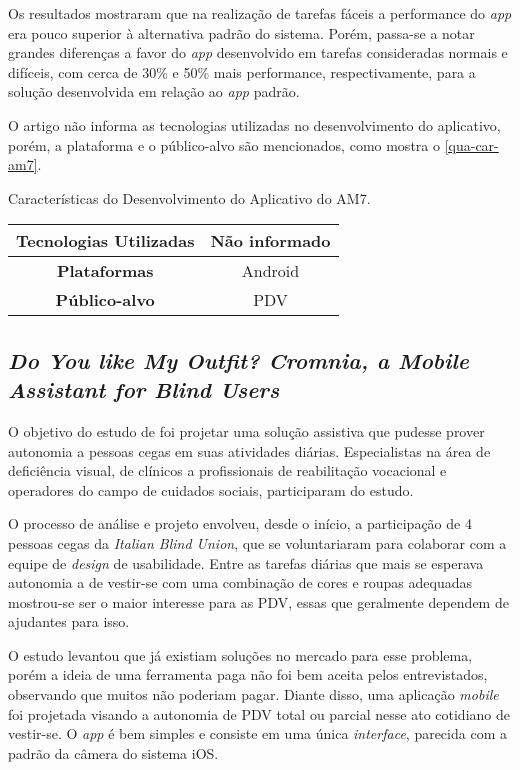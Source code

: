 Os resultados mostraram que na realização de tarefas fáceis a performance do \emph{app} era pouco superior à alternativa padrão do sistema.
Porém, passa-se a notar grandes diferenças a favor do \emph{app} desenvolvido em tarefas consideradas normais e difíceis, com cerca de 30\% e 50\% mais performance, respectivamente, para a solução desenvolvida em relação ao \emph{app} padrão.

O artigo não informa as tecnologias utilizadas no desenvolvimento do aplicativo, porém, a plataforma e o público-alvo são
mencionados, como mostra o \autoref{qua-car-am7}.

\begin{quadro}[htb!]
  \caption{\label{qua-car-am7}Características do Desenvolvimento do Aplicativo do AM7.}
  \begin{tabular}{|c|c|}
    \hline
    \textbf{Tecnologias Utilizadas} & Não informado \\ \hline
    \textbf{Plataformas}            & Android       \\ \hline
    \textbf{Público-alvo}           & PDV           \\
    \hline
  \end{tabular}
\end{quadro}

\subsection{\emph{Do You like My Outfit? Cromnia, a Mobile Assistant for Blind Users}}

O objetivo do estudo de  foi projetar uma solução assistiva que pudesse prover autonomia a pessoas cegas em suas atividades diárias.
Especialistas na área de deficiência visual, de clínicos a profissionais de reabilitação vocacional e operadores do campo de cuidados sociais, participaram do estudo.

O processo de análise e projeto envolveu, desde o início, a participação de 4 pessoas cegas da \emph{Italian Blind Union}, que se voluntariaram para colaborar com a equipe de \emph{design} de usabilidade.
Entre as tarefas diárias que mais se esperava autonomia a de vestir-se com uma combinação de cores e roupas adequadas mostrou-se ser o maior interesse para as PDV, essas que geralmente dependem de ajudantes para isso.

O estudo levantou que já existiam soluções no mercado para esse problema, porém a ideia de uma ferramenta paga não foi bem aceita
pelos entrevistados, observando que muitos não poderiam pagar.
Diante disso, uma aplicação \emph{mobile} foi projetada visando a autonomia de PDV total ou parcial nesse ato cotidiano de vestir-se.
O \emph{app} é bem simples e consiste em uma única \emph{interface}, parecida com a padrão da câmera do sistema iOS\@.

